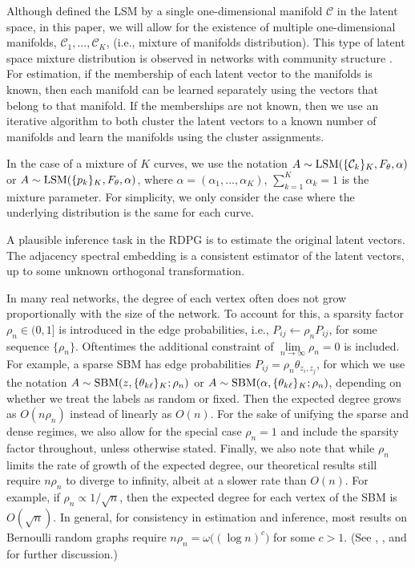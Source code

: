 \documentclass[12pt]{article}
\begin{document}
\begin{remark}
\label{rem:lsm-mixture}
Although \citet{athreya2020estimation} defined the LSM by a single one-dimensional manifold $\mathcal{C}$ in the latent space, in this paper, we will allow for the existence of multiple one-dimensional manifolds, $\mathcal{C}_1, ..., \mathcal{C}_K$, (i.e., mixture of manifolds distribution). 
This type of latent space mixture distribution is observed in networks with community structure \citep{10.5555/3122009.3242083}. 
For estimation, if the membership of each latent vector to the manifolds is known, then each manifold can be learned separately using the vectors that belong to that manifold. 
If the memberships are not known, then we use an iterative algorithm to both cluster the latent vectors to a known number of manifolds and learn the manifolds using the cluster assignments. 

In the case of a mixture of $K$ curves, we use the notation $A \sim \mathrm{LSM}(\{\mathcal{C}_k\}_K, F_\theta, \alpha)$ or $A \sim \mathrm{LSM}(\{p_k\}_K, F_\theta, \alpha)$, where $\alpha = (\alpha_1, ..., \alpha_K)$, $\sum_{k=1}^K \alpha_k = 1$ is the mixture parameter. 
For simplicity, we only consider the case where the underlying distribution is the same for each curve. 
\end{remark}

A plausible inference task in the RDPG is to estimate the original
latent vectors. The adjacency spectral embedding
\citep{doi:10.1080/01621459.2012.699795} is a consistent estimator of
the latent vectors, up to some unknown orthogonal transformation.

\begin{remark}
In many real networks, the degree of each vertex often does not grow proportionally with the size of the network. 
To account for this, a sparsity factor $\rho_n \in (0, 1]$ is introduced in the edge probabilities, i.e., $P_{ij} \leftarrow \rho_n P_{ij}$, for some sequence $\{\rho_n\}$. 
Oftentimes the additional constraint of $\lim\limits_{n \to \infty} \rho_n = 0$ is included. 
For example, a sparse SBM has edge probabilities $P_{ij} = \rho_n \theta_{z_i, z_j}$, for which we use the notation $A \sim \mathrm{SBM}(z, \{\theta_{k \ell}\}_K; \rho_n)$ or $A \sim \mathrm{SBM}(\alpha, \{\theta_{k \ell}\}_K; \rho_n)$, depending on whether we treat the labels as random or fixed. 
Then the expected degree grows as $O(n \rho_n)$ instead of linearly as $O(n)$. 
For the sake of unifying the sparse and dense regimes, we also allow for the special case $\rho_n = 1$ and include the sparsity factor throughout, unless otherwise stated. 
Finally, we also note that while $\rho_n$ limits the rate of growth of the expected degree, our theoretical results still require $n \rho_n$ to diverge to infinity, albeit at a slower rate than $O(n)$. 
For example, if $\rho_n \propto 1 / \sqrt{n}$, then the expected degree for each vertex of the SBM is $O(\sqrt{n})$. 
In general, for consistency in estimation and inference, most results on Bernoulli random graphs require $n \rho_n = \omega \big( (\log n)^c \big)$ for some $c > 1$. 
(See \citet{JMLR:v18:16-480}, \citet{https://doi.org/10.48550/arxiv.2106.09840}, and \citet{rubindelanchy2017statistical} for further discussion.)
\end{remark}
\end{document}
